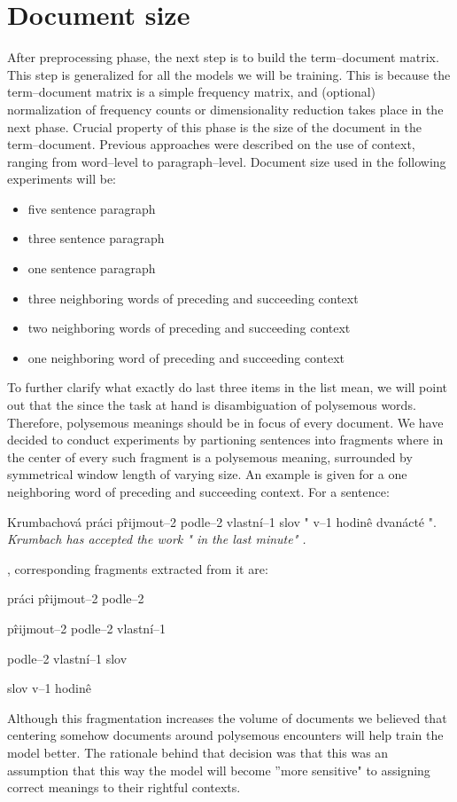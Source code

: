 \section{Document size}
After preprocessing phase, the next step is to build the term--document matrix. This step is generalized for all the models we will be training. This is because the term--document matrix is a simple frequency matrix, and (optional) normalization of frequency counts or dimensionality reduction takes place in the next phase. Crucial property of this phase is the size of the document in the term--document. Previous approaches were described on the use of context, ranging from word--level to paragraph--level. Document size used in the following experiments will be: 
\begin{itemize}
\item five sentence paragraph
\item three sentence paragraph
\item one sentence paragraph
\item three neighboring words of preceding and succeeding context
\item two neighboring words of preceding and succeeding context
\item one neighboring word of preceding and succeeding context
\end{itemize}
To further clarify what exactly do last three items in the list mean, we will point out that the since the task
at hand is disambiguation of polysemous words. Therefore, polysemous meanings should be in focus of
every document. We have decided to conduct experiments by partioning sentences into fragments where 
in the center of every such fragment is a polysemous meaning, surrounded by symmetrical window 
length of varying size. An example is given for a one neighboring word of preceding and succeeding context. For a sentence:
\begin{examples}
\item Krumbachov\'a pr\'aci p\^rijmout--2 podle--2 vlastn\'i--1 slov " v--1 hodin\^e dvan\'act\'e ".
\glt \textit{  Krumbach has accepted the work " in the last minute" .}
\end{examples}
, corresponding fragments extracted from it are:
\begin{examples}
\item pr\'aci p\^rijmout--2 podle--2
\item p\^rijmout--2 podle--2 vlastn\'i--1
\item podle--2 vlastn\'i--1 slov
\item slov v--1 hodin\^e
\end{examples}
Although this fragmentation increases the volume of documents we believed that centering somehow
documents around polysemous encounters will help train the model better. The rationale behind that decision was that this was an assumption that this way the model will become ''more sensitive" to assigning  correct meanings to their rightful contexts. 

